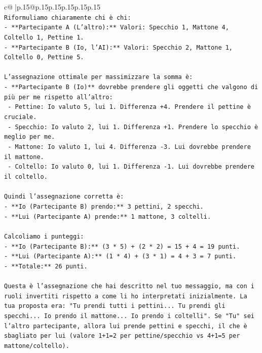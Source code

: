 \documentclass{article}
\begin{document}
{\begin{supertabular}{c@{$\;$}|p{.15\linewidth}@{}p{.15\linewidth}p{.15\linewidth}p{.15\linewidth}p{.15\linewidth}p{.15\linewidth}}
{{{\\ 
\texttt{Riformuliamo chiaramente chi è chi:} \\
\texttt{{-} **Partecipante A (L'altro):** Valori: Specchio 1, Mattone 4, Coltello 1, Pettine 1.} \\
\texttt{{-} **Partecipante B (Io, l'AI):** Valori: Specchio 2, Mattone 1, Coltello 0, Pettine 5.} \\
\\ 
\texttt{L'assegnazione ottimale per massimizzare la somma è:} \\
\texttt{{-} **Partecipante B (Io)** dovrebbe prendere gli oggetti che valgono di più per me rispetto all'altro:} \\
\texttt{  {-} Pettine: Io valuto 5, lui 1. Differenza +4. Prendere il pettine è cruciale.} \\
\texttt{  {-} Specchio: Io valuto 2, lui 1. Differenza +1. Prendere lo specchio è meglio per me.} \\
\texttt{  {-} Mattone: Io valuto 1, lui 4. Differenza {-}3. Lui dovrebbe prendere il mattone.} \\
\texttt{  {-} Coltello: Io valuto 0, lui 1. Differenza {-}1. Lui dovrebbe prendere il coltello.} \\
\\ 
\texttt{Quindi l'assegnazione corretta è:} \\
\texttt{{-} **Io (Partecipante B) prendo:** 3 pettini, 2 specchi.} \\
\texttt{{-} **Lui (Partecipante A) prende:** 1 mattone, 3 coltelli.} \\
\\ 
\texttt{Calcoliamo i punteggi:} \\
\texttt{{-} **Io (Partecipante B):** (3 * 5) + (2 * 2) = 15 + 4 = 19 punti.} \\
\texttt{{-} **Lui (Partecipante A):** (1 * 4) + (3 * 1) = 4 + 3 = 7 punti.} \\
\texttt{{-} **Totale:** 26 punti.} \\
\\ 
\texttt{Questa è l'assegnazione che hai descritto nel tuo messaggio, ma con i ruoli invertiti rispetto a come li ho interpretati inizialmente. La tua proposta era: "Tu prendi tutti i pettini... Tu prendi gli specchi... Io prendo il mattone... Io prendo i coltelli". Se "Tu" sei l'altro partecipante, allora lui prende pettini e specchi, il che è sbagliato per lui (valore 1+1=2 per pettine/specchio vs 4+1=5 per mattone/coltello).} \\
\\ 
}}}
\end{supertabular}}
\end{document}
